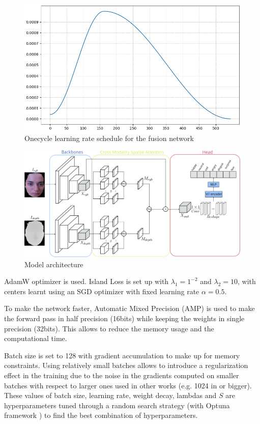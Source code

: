 \begin{figure}[H]
    \centering
    \includegraphics[width=0.8\columnwidth]{Images/onecycle_lr.png}
    \caption{Onecycle learning rate schedule for the fusion network}
    \label{lr_sched}
\end{figure}


\begin{figure}[ht]
    \centering
    \includegraphics[width=2.2\columnwidth]{Images/full_net.png}
    \caption{Model architecture}
    \label{full_net}
\end{figure}


AdamW optimizer is used. Island Loss is set up with $\lambda_1=1^{-2}$ and $\lambda_2=10$, with centers learnt using an SGD optimizer with fixed learning rate $\alpha=0.5$.

To make the network faster, Automatic Mixed Precision (AMP) is used to make the forward pass in half precision (16bits) while keeping the weights in single precision (32bits). This allows to reduce the memory usage and the computational time.

Batch size is set to 128 with gradient accumulation to make up for memory constraints. Using relatively small batches allows to introduce a regularization effect in the training due to the noise in the gradients computed on smaller batches with respect to larger ones used in other works (e.g. 1024 in \cite{RW_4B_CLIP} or bigger). These values of batch size, learning rate, weight decay, lambdas and $S$ are hyperparameters tuned through a random search strategy (with Optuna framework \cite{Optuna}) to find the best combination of hyperparameters.

